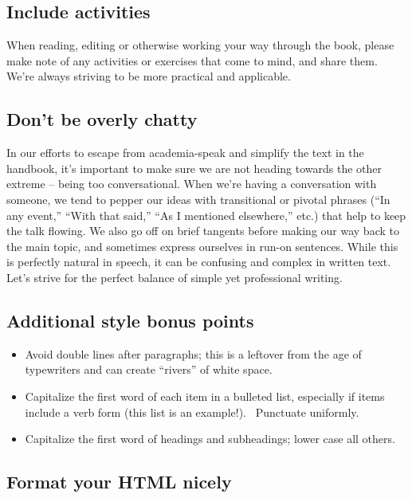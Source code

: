 \subsection{Include activities}

When reading, editing or otherwise working your way through the book,
please make note of any activities or exercises that come to mind, and
share them.~ We're always striving to be more practical and applicable.

\subsection{Don't be overly chatty}

In our efforts to escape from academia-speak and simplify the text in
the handbook, it's important to make sure we are not heading towards the
other extreme -- being too conversational. When we're having a
conversation with someone, we tend to pepper our ideas with transitional
or pivotal phrases (``In any event,'' ``With that said,'' ``As I
mentioned elsewhere,'' etc.) that help to keep the talk flowing. We also
go off on brief tangents before making our way back to the main topic,
and sometimes express ourselves in run-on sentences. While this is
perfectly natural in speech, it can be confusing and complex in written
text. Let's strive for the perfect balance of simple yet professional
writing.

\subsection{Additional style bonus points}

\begin{itemize}
\itemsep1pt\parskip0pt
\item
  Avoid double lines after paragraphs; this is a leftover from the age
  of typewriters and can create ``rivers'' of white space.
\item
  Capitalize the first word of each item in a bulleted list, especially
  if items include a verb form (this list is an example!).~ Punctuate
  uniformly.
\item
  Capitalize the first word of headings and subheadings; lower case all
  others.
\end{itemize}

\subsection{Format your HTML nicely}

